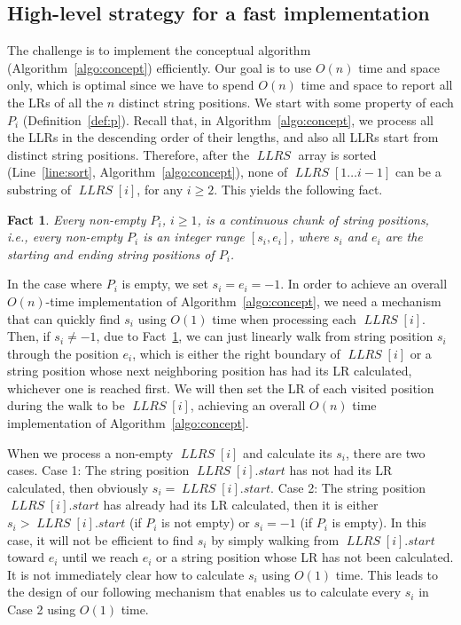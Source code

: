 \documentclass[preprint]{elsarticle}
\newtheorem{fact}{Fact}[section]
\DeclareMathOperator{\llrs}{\mathit{LLRS}}
\begin{document}
\subsection{High-level strategy for a fast implementation}
\label{subsec:table}
The challenge is to implement the conceptual algorithm
(Algorithm~\ref{algo:concept}) efficiently. Our goal is to use $O(n)$
time and space only, which is optimal since we have to spend $O(n)$
time and space to report all the LRs of all the $n$ distinct string
positions.
We start with some property of each $P_i$ (Definition~\ref{def:p}).
Recall that, in Algorithm~\ref{algo:concept}, we process all the LLRs
in the descending order of their lengths, and also all LLRs start from
distinct string positions. Therefore, after the $\llrs$ array is
sorted (Line~\ref{line:sort}, Algorithm~\ref{algo:concept}),
none of
$\llrs[1\ldots i-1]$ can be a substring of $\llrs[i]$,  for any $i\geq
2$. This yields the following fact.


\begin{fact}
\label{fact:p}
Every non-empty $P_i$, $i\geq 1$, is a continuous chunk of
string positions, i.e., every non-empty $P_i$ is an integer range $[s_i,e_i]$,
where $s_i$ and $e_i$ are the starting
and ending string positions of $P_i$. 
\end{fact}
In the case where $P_i$ is empty, we set $s_i = e_i = -1$.
In order to achieve an overall $O(n)$-time implementation of
Algorithm~\ref{algo:concept}, we need a mechanism that can quickly
find $s_i$ using $O(1)$ time when processing each $\llrs[i]$. Then, if
$s_i\neq -1$, due to Fact~\ref{fact:p}, we can just linearly walk from
string position $s_i$ through the position $e_i$, which is either the
right boundary of $\llrs[i]$ or a string position whose next
neighboring position has had its LR calculated, whichever one
is reached first.  We will then set the LR of each visited position
during the walk to be $\llrs[i]$, achieving an overall $O(n)$ time
implementation of Algorithm~\ref{algo:concept}.

When we process a non-empty $\llrs[i]$ and calculate its $s_i$, there
are two cases.  Case 1: The string position $\llrs[i].start$ has not
had its LR calculated, then obviously $s_i = \llrs[i].start$.  Case 2:
The string position $\llrs[i].start$ has already had its LR
calculated, then it is either $s_i > \llrs[i].start$ (if $P_i$ is not
empty) or $s_i = -1$ (if $P_i$ is empty). In this case, it will not be
efficient to find $s_i$ by simply walking from $\llrs[i].start$ toward
$e_i$ until we reach $e_i$ or a string position whose LR has not been
calculated. It is not immediately clear how to calculate
$s_i$ using $O(1)$ time. This leads to the design of our following
mechanism that enables us to calculate every $s_i$ in Case 2 using
$O(1)$ time.
\end{document}
